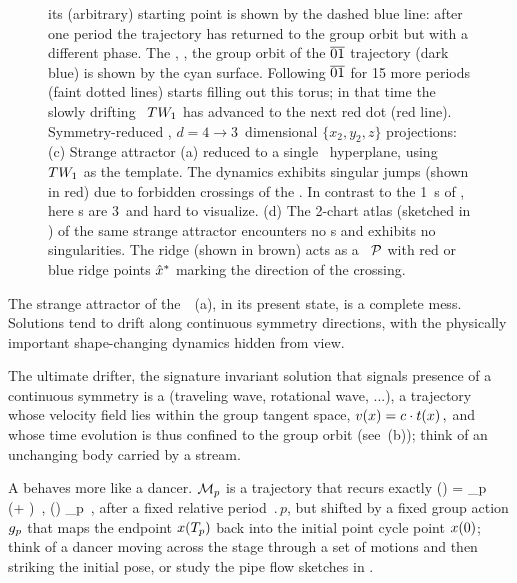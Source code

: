 \documentclass[aip,cha,reprint,
secnumarabic,
nofootinbib, tightenlines,
nobibnotes, showkeys, showpacs,
groupedaddress
]{revtex4-1}
\begin{document}
\begin{figure}
{  its (arbitrary) starting point is shown by the dashed blue line: after
  one period the trajectory has returned to the group orbit but with a
  different phase. The \wurst, \ie, the group orbit of the $\overline{01}$
  trajectory (dark blue) is shown by the cyan surface. Following
  $\overline{01}$ for 15 more periods (faint dotted lines) starts filling
  out this torus; in that time the slowly drifting \reqv\ $TW_{1}$
  has advanced to the next red dot (red line).
Symmetry-reduced \cLf, $d=4 \to 3$~dimensional $\{x_2,y_2,z\}$ projections:
 (c)
 Strange attractor (a) reduced to a single \slice\ hyperplane, using
 $TW_{1}$ as the template. The dynamics exhibits singular jumps
 (shown in red) due to forbidden crossings of the \chartBord. In contrast
 to the 1\dmn\ \poincBord s of , here \chartBord s
 are 3\dmn\ and hard to visualize.
 (d)
The 2-chart atlas (sketched in ) of the same
strange attractor encounters no \chartBord s and exhibits no
singularities. The ridge (shown in brown) acts as a \PoincSec\ ${\cal P}$ with red or
blue ridge points $\hat{x}^*$ marking the direction of the crossing.
  }
\label{fig:CLf01group}
\end{figure}

The strange attractor of the \cLf\ \,(a), in its
present state, is a complete mess. Solutions tend to drift along
continuous symmetry directions, with the physically important
shape-changing dynamics hidden from view.

The ultimate drifter, the signature invariant solution that signals
presence of a continuous symmetry is a {\em \reqv} (traveling wave,
rotational wave, ...), a trajectory whose velocity field lies within the
group tangent space,
\(
v(x) = c \cdot t(x)
\,,
\) %
and whose time evolution is thus confined to the group orbit (see
\,(b)); think of an unchanging body carried by a
stream.

A {\em \rpo} behaves more like a dancer. ${\cal M}_p$ is a trajectory that
recurs exactly
\beq
\ssp(\zeit) = \LieEl_p \, \ssp(\zeit +  )
    \,,\qquad
\ssp(\zeit) \in \pS_p
    \,,
after a fixed {relative period} $\period{p}$, but shifted by a fixed
group action ${g_p}$ that maps the endpoint $x ({T_{p}}) $ back
into the initial point cycle point $x (0) $; think of a dancer moving
across the stage through a set of motions and then striking the initial
pose, or study the pipe flow sketches in .
\end{document}

